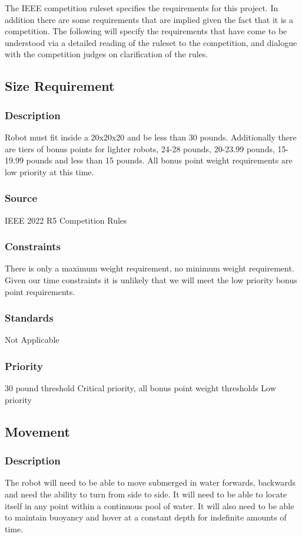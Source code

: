 The IEEE competition ruleset specifies the requirements for this project. In addition there are some requirements that are implied given the fact that it is a competition. The following will specify the requirements that have come to be understood via a detailed reading of the ruleset to the competition, and dialogue with the competition judges on clarification of the rules. 

\subsection{Size Requirement}
\subsubsection{Description}
Robot must fit inside a 20x20x20 and be less than 30 pounds. Additionally there are tiers of bonus points for lighter robots, 24-28 pounds, 20-23.99 pounds, 15-19.99 pounds and less than 15 pounds. All bonus point weight requirements are low priority at this time.
\subsubsection{Source}
IEEE 2022 R5 Competition Rules
\subsubsection{Constraints}
There is only a maximum weight requirement, no minimum weight requirement. Given our time constraints it is unlikely that we will meet the low priority bonus point requirements.
\subsubsection{Standards}
Not Applicable
\subsubsection{Priority}
30 pound threshold Critical priority, all bonus point weight thresholds Low priority

\subsection{Movement}
\subsubsection{Description}
The robot will need to be able to move submerged in water forwards, backwards and need the ability to turn from side to side. It will need to be able to locate itself in any point within a continuous pool of water. It will also need to be able to maintain buoyancy and hover at a constant depth for indefinite amounts of time.
